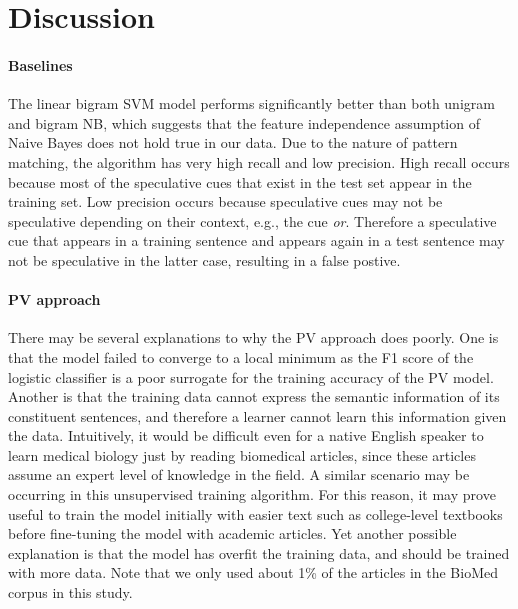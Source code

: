 \documentclass{article}
\begin{document}
%
%
%
%

\section{Discussion}

\paragraph{Baselines} The linear bigram SVM model performs significantly better than both unigram and bigram NB, which suggests that the feature independence assumption of Naive Bayes does not hold true in our data. Due to the nature of pattern matching, the algorithm has very high recall and low precision. High recall occurs because most of the speculative cues that exist in the test set appear in the training set. Low precision occurs because speculative cues may not be speculative depending on their context, e.g., the cue {\it or}. Therefore a speculative cue that appears in a training sentence and appears again in a test sentence may not be speculative in the latter case, resulting in a false postive.

\paragraph{PV approach} There may be several explanations to why the PV approach does poorly. One is that the model failed to converge to a local minimum as the F1 score of the logistic classifier is a poor surrogate for the training accuracy of the PV model. Another is that the training data cannot express the semantic information of its constituent sentences, and therefore a learner cannot learn this information given the data. Intuitively, it would be difficult even for a native English speaker to learn medical biology just by reading biomedical articles, since these articles assume an expert level of knowledge in the field. A similar scenario may be occurring in this unsupervised training algorithm. For this reason, it may prove useful to train the model initially with easier text such as college-level textbooks before fine-tuning the model with academic articles. Yet another possible explanation is that the model has overfit the training data, and should be trained with more data. Note that we only used about 1\% of the articles in the BioMed corpus in this study.
\end{document}

